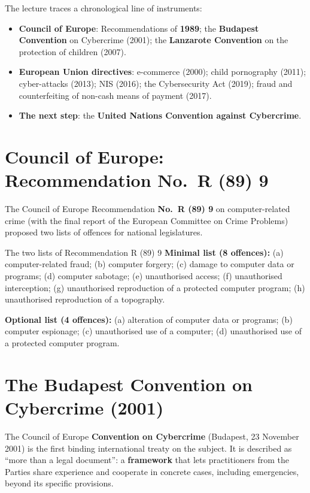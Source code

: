 \documentclass[11pt,a4paper,openany]{report}
\theoremstyle{definition}
\theoremstyle{plain}
\theoremstyle{remark}
\begin{document}
The lecture traces a chronological line of instruments:
\begin{itemize}
    \item \textbf{Council of Europe}: Recommendations of \textbf{1989}; the \textbf{Budapest Convention} on Cybercrime (2001); the \textbf{Lanzarote Convention} on the protection of children (2007).
    \item \textbf{European Union directives}: e-commerce (2000); child pornography (2011); cyber-attacks (2013); NIS (2016); the Cybersecurity Act (2019); fraud and counterfeiting of non-cash means of payment (2017).
    \item \textbf{The next step}: the \textbf{United Nations Convention against Cybercrime}.
\end{itemize}

\section{Council of Europe: Recommendation No.\ R (89) 9}

The Council of Europe Recommendation \textbf{No.\ R (89) 9} on computer-related crime (with the final report of the European Committee on Crime Problems) proposed two lists of offences for national legislatures.

\begin{sidebox}{The two lists of Recommendation R (89) 9}
\textbf{Minimal list (8 offences):} (a) computer-related fraud; (b) computer forgery; (c) damage to computer data or programs; (d) computer sabotage; (e) unauthorised access; (f) unauthorised interception; (g) unauthorised reproduction of a protected computer program; (h) unauthorised reproduction of a topography.

\textbf{Optional list (4 offences):} (a) alteration of computer data or programs; (b) computer espionage; (c) unauthorised use of a computer; (d) unauthorised use of a protected computer program.
\end{sidebox}

\section{The Budapest Convention on Cybercrime (2001)}

The Council of Europe \textbf{Convention on Cybercrime} (Budapest, 23 November 2001) is the first binding international treaty on the subject. It is described as ``more than a legal document'': a \textbf{framework} that lets practitioners from the Parties share experience and cooperate in concrete cases, including emergencies, beyond its specific provisions.
\end{document}
